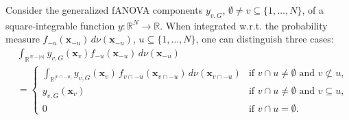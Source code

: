 \begin{proposition}\label{prop:integration_cases}
Consider the generalized fANOVA components $y_{v,G}$, $\emptyset \ne v \subseteq \{1,\dots,N\}$, of a square-integrable function $y : \mathbb{R}^N \to \mathbb{R}$. When integrated w.r.t. the probability measure $f_{-u}(\boldsymbol{x}_{-u})\, d \nu(\boldsymbol{x}_{-u})$, $u \subseteq \{1,\dots,N\}$, one can distinguish three cases:
\begin{equation}
\begin{aligned}
& \int_{\mathbb{R}^{N - |u|}} y_{v,G}(\boldsymbol{x}_v) 
    f_{-u}(\boldsymbol{x}_{-u}) \, d \nu(\boldsymbol{x}_{-u}) \\[0.5em]
&= 
\begin{cases}
    \displaystyle 
    \int_{\mathbb{R}^{|v \cap -u|}} 
        y_{v,G}(\boldsymbol{x}_v)\,
        f_{v \cap -u}(\boldsymbol{x}_{v \cap -u})\,
        d \nu(\boldsymbol{x}_{v \cap -u}) 
        & \text{if } v \cap u \ne \emptyset \text{ and } v \not\subset u, \\[1ex]
    y_{v,G}(\boldsymbol{x}_v) 
        & \text{if } v \cap u \ne \emptyset \text{ and } v \subseteq u, \\[1ex]
    0 
        & \text{if } v \cap u = \emptyset.
\end{cases}
\end{aligned}
\end{equation}
\label{prop:integration_cases}
\end{proposition}

